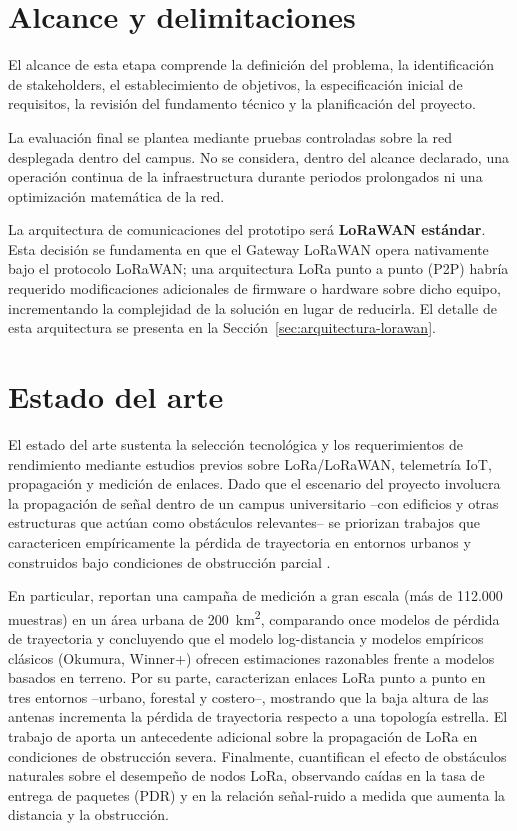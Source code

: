 \documentclass[12pt,oneside,openany,spanish,oldfontcommands]{memoir}
\begin{document}
\section{Alcance y delimitaciones}

El alcance de esta etapa comprende la definición del problema, la identificación de
stakeholders, el establecimiento de objetivos, la especificación inicial de requisitos,
la revisión del fundamento técnico y la planificación del proyecto.

La evaluación final se plantea mediante pruebas controladas sobre la red desplegada dentro
del campus. No se considera, dentro del alcance declarado, una operación continua de la
infraestructura durante periodos prolongados ni una optimización matemática de la red.

La arquitectura de comunicaciones del prototipo será \textbf{LoRaWAN estándar}. Esta
decisión se fundamenta en que el Gateway LoRaWAN opera nativamente bajo el protocolo LoRaWAN;
una arquitectura LoRa punto a punto (P2P) habría requerido modificaciones adicionales de
firmware o hardware sobre dicho equipo, incrementando la complejidad de la solución en lugar
de reducirla. El detalle de esta arquitectura se presenta en la Sección~\ref{sec:arquitectura-lorawan}.

\section{Estado del arte}

El estado del arte sustenta la selección tecnológica y los requerimientos de
rendimiento mediante estudios previos sobre LoRa/LoRaWAN, telemetría IoT, propagación y
medición de enlaces. Dado que el escenario del proyecto involucra la propagación de señal
dentro de un campus universitario --con edificios y otras estructuras que actúan como
obstáculos relevantes-- se priorizan trabajos que caractericen empíricamente la pérdida
de trayectoria en entornos urbanos y construidos bajo condiciones de obstrucción parcial
\parencite{rademacher2021,callebaut2020,bianco2021,ahmed2024vegetacion}.

En particular, \textcite{rademacher2021} reportan una campaña de medición a gran escala
(más de 112.000 muestras) en un área urbana de 200~km\textsuperscript{2}, comparando once
modelos de pérdida de trayectoria y concluyendo que el modelo log-distancia y modelos
empíricos clásicos (Okumura, Winner+) ofrecen estimaciones razonables frente a modelos
basados en terreno. Por su parte, \textcite{callebaut2020} caracterizan enlaces LoRa
punto a punto en tres entornos --urbano, forestal y costero--, mostrando que la baja
altura de las antenas incrementa la pérdida de trayectoria respecto a una topología
estrella. El trabajo de \textcite{bianco2021} aporta un antecedente adicional sobre la
propagación de LoRa en condiciones de obstrucción severa. Finalmente,
\textcite{ahmed2024vegetacion} cuantifican el efecto de obstáculos naturales sobre el
desempeño de nodos LoRa, observando caídas en la tasa de entrega de paquetes (PDR) y en la
relación señal-ruido a medida que aumenta la distancia y la obstrucción.
\end{document}

